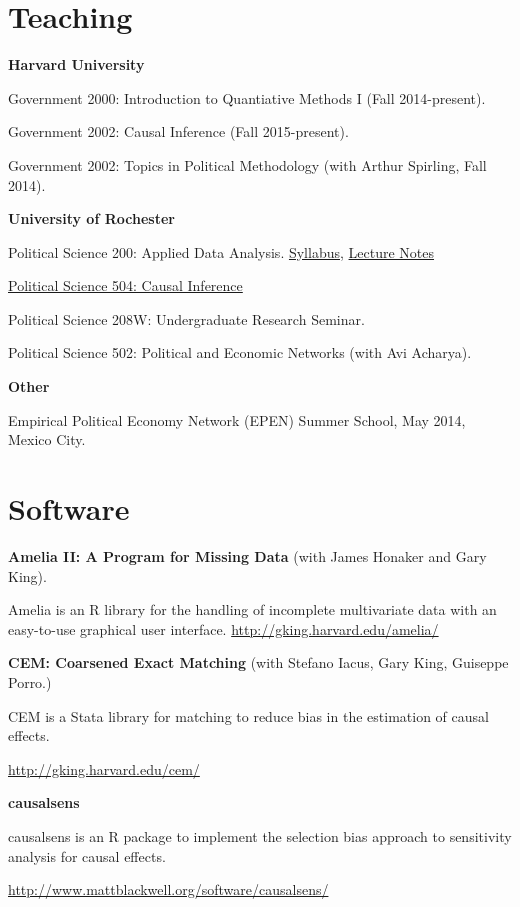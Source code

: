 \documentclass[margin,line,12pt]{res}
\newenvironment{list1}{
  \begin{list}{\ding{113}}{%
      \setlength{\itemsep}{0in}
      \setlength{\parsep}{0in} \setlength{\parskip}{0in}
      \setlength{\topsep}{0in} \setlength{\partopsep}{0in} 
      \setlength{\leftmargin}{0.83 cm}}}{\end{list}}
\begin{document}
\begin{resume}
\section{\textsf{\sc Teaching}}
{\bf Harvard University}
\begin{list1}
\item[] Government 2000: Introduction to Quantiative Methods I (Fall 2014-present).
\item[] Government 2002: Causal Inference (Fall 2015-present).
\item[] Government 2002: Topics in Political Methodology (with Arthur Spirling, Fall 2014).
\end{list1}

{\bf University of Rochester}
\begin{list1}
\item[] Political Science 200: Applied Data Analysis. \href{http://www.mattblackwell.org/files/teaching/psc200-syllabus.pdf}{Syllabus}, \href{http://www.mattblackwell.org/files/teaching/psc200-notes.pdf}{Lecture Notes}
\item[] \href{http://www.mattblackwell.org/teaching/psc504/}{Political Science 504: Causal Inference}
\item[] Political Science 208W: Undergraduate Research Seminar.
\item[] Political Science 502: Political and Economic Networks (with Avi Acharya).
\end{list1}

{\bf Other}
\begin{list1}
\item[] Empirical Political Economy Network (EPEN) Summer School, May 2014, Mexico City. 
\end{list1}



\section{\sc Software}
{\bf Amelia II: A Program for Missing Data} (with James Honaker and Gary
King). 
\begin{list1}
\item[] Amelia is an R library for the handling of incomplete multivariate
  data with an easy-to-use graphical user
  interface. \url{http://gking.harvard.edu/amelia/} 
\end{list1}
{\bf CEM: Coarsened Exact Matching} (with Stefano Iacus, Gary
King, Guiseppe  Porro.)
\begin{list1}
\item[] CEM is a Stata library for matching to reduce bias in the estimation of
  causal effects. 
\item[] \url{http://gking.harvard.edu/cem/}
\end{list1}
{\bf causalsens} 
\begin{list1}
\item[] causalsens is an R package to implement the selection bias approach to sensitivity analysis for causal effects.
\item[] \url{http://www.mattblackwell.org/software/causalsens/}
\end{list1}


\end{resume}
\end{document}
